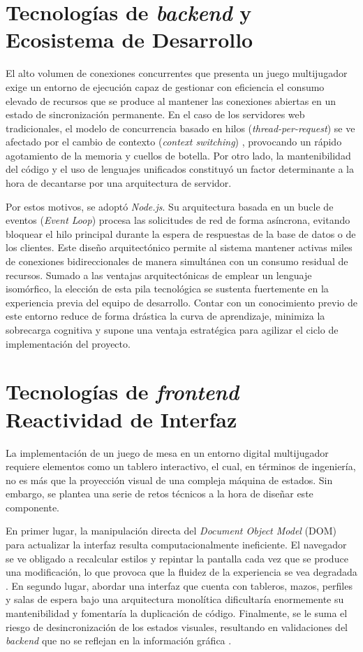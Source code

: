 \section{Tecnologías de \textit{backend} y Ecosistema de Desarrollo}

El alto volumen de conexiones concurrentes que presenta un juego multijugador exige un entorno de ejecución capaz de gestionar con eficiencia el consumo elevado de recursos que se produce al mantener las conexiones abiertas en un estado de sincronización permanente. En el caso de los servidores web tradicionales, el modelo de concurrencia basado en hilos (\textit{thread-per-request}) se ve afectado por el cambio de contexto (\textit{context switching}) \cite{tilkov_node}, provocando un rápido agotamiento de la memoria y cuellos de botella. Por otro lado, la mantenibilidad del código y el uso de lenguajes unificados constituyó un factor determinante a la hora de decantarse por una arquitectura de servidor. 

Por estos motivos, se adoptó \textit{Node.js}. Su arquitectura basada en un bucle de eventos (\textit{Event Loop}) procesa las solicitudes de red de forma asíncrona, evitando bloquear el hilo principal durante la espera de respuestas de la base de datos o de los clientes. Este diseño arquitectónico permite al sistema mantener activas miles de conexiones bidireccionales de manera simultánea con un consumo residual de recursos. Sumado a las ventajas arquitectónicas de emplear un lenguaje isomórfico, la elección de esta pila tecnológica se sustenta fuertemente en la experiencia previa del equipo de desarrollo. Contar con un conocimiento previo de este entorno reduce de forma drástica la curva de aprendizaje, minimiza la sobrecarga cognitiva y supone una ventaja estratégica para agilizar el ciclo de implementación del proyecto.

\section{Tecnologías de \textit{frontend} Reactividad de Interfaz}

La implementación de un juego de mesa en un entorno digital multijugador requiere elementos como un tablero interactivo, el cual, en términos de ingeniería, no es más que la proyección visual de una compleja máquina de estados. Sin embargo, se plantea una serie de retos técnicos a la hora de diseñar este componente. 

En primer lugar, la manipulación directa del \textit{Document Object Model} (DOM) para actualizar la interfaz resulta computacionalmente ineficiente. El navegador se ve obligado a recalcular estilos y repintar la pantalla cada vez que se produce una modificación, lo que provoca que la fluidez de la experiencia se vea degradada \cite{mardan_react}. En segundo lugar, abordar una interfaz que cuenta con tableros, mazos, perfiles y salas de espera bajo una arquitectura monolítica dificultaría enormemente su mantenibilidad y fomentaría la duplicación de código. Finalmente, se le suma el riesgo de desincronización de los estados visuales, resultando en validaciones del \textit{backend} que no se reflejan en la información gráfica \cite{banks_react}.  

